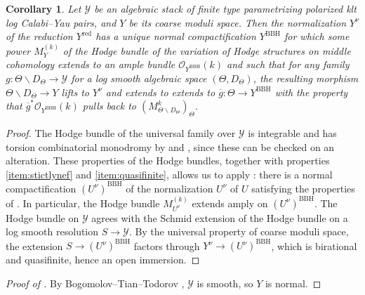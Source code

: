 \documentclass{amsart}
\newcommand{\bs}{\backslash}
\newcommand{\ol}{\overline}
\newtheorem{cor}[theorem]{Corollary}
\theoremstyle{definition}
\theoremstyle{remark}
\def\cO{\mathcal{O}}
\def\cY{\mathcal{Y}}
\renewcommand{\bar}[1]{\ol{#1}}
\def\BBH{\mathrm{BBH}}
\numberwithin{equation}{section}
\def\testsp{\Theta}
\begin{document}
\begin{cor}\label{cor:CYmod}
Let $\cY$ be an
algebraic stack of finite type  parametrizing  polarized klt log Calabi--Yau pairs, and $Y$ be its coarse moduli space. Then the normalization $Y^{\nu}$ of the reduction $Y^{\mathrm{red}}$ has a unique normal compactification $Y^\BBH$ for which some power $M_Y^{(k)}$ of the Hodge bundle of the variation of Hodge structures on middle cohomology extends to an ample bundle $\cO_{Y^\BBH}(k)$ and such that for any family $g:\testsp\bs D_\testsp\to \cY$
for a log smooth algebraic space $(\testsp,D_\testsp)$, the resulting morphism $\testsp\bs D_\testsp\to Y$ lifts to $Y^{\nu}$ and extends to extends to $\bar g \colon \testsp\to Y^\BBH$ with the property that $\bar g^*\cO_{Y^\BBH}(k)$ pulls back to $(M^k_{\testsp\bs D_\testsp})_\testsp$.
\end{cor}
\begin{proof}
The Hodge bundle of the universal family over $\cY$ is integrable and has torsion combinatorial monodromy by  and , since these can be checked on an alteration.  These properties of the Hodge bundles, together with properties \ref{item:stictlynef} and \ref{item:quasifinite}, allows us to apply  : there is a normal compactification $(U^{\nu})^{\BBH}$ of the normalization $U^{\nu}$ of $U$ satisfying the properties of . In particular, the Hodge bundle $M_{U^{\nu}}^{(k)}$ extends amply on $(U^{\nu})^{\BBH}$. 
The Hodge bundle on $\cY$ agrees with the Schmid extension of  the Hodge bundle on a log smooth resolution $S \to \cY$. By the universal property of coarse moduli space, the extension $S \to (U^{\nu})^{\BBH}$ factors through $Y^{\nu}\to (U^{\nu})^{\BBH}$, which is birational and quasifinite, 
hence an open immersion. 
\end{proof}


\begin{proof}[Proof of ]
By Bogomolov--Tian--Todorov \cite{bogomolov,tian,todorov}, $\cY$ is smooth, so $Y$ is normal.  \end{proof}
\end{document}
